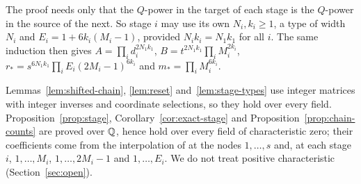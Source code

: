 \begin{remark}\label{rem:varying-powers}
The proof needs only that the \(Q\)-power in the target of each stage is
the \(Q\)-power in the source of the next. So stage \(i\) may use its own
\(N_i,k_i\ge1\), a type of width \(N_i\) and \(E_i=1+6k_i(M_i-1)\),
provided \(N_ik_i=N_1k_1\) for all \(i\).
The same induction then gives \(A=\prod_id_i^{2N_1k_1}\),
\(B=t^{2N_1k_1}\prod_iM_i^{2k_i}\),
\(r_*=s^{6N_1k_1}\prod_iE_i(2M_i-1)^{6k_i}\) and
\(m_*=\prod_iM_i^{6k_i}\).
\end{remark}

\begin{remark}[Fields]\label{rem:field-scope}
Lemmas~\ref{lem:shifted-chain}, \ref{lem:reset}
and~\ref{lem:stage-types} use integer matrices with integer inverses and
coordinate selections, so they hold over every field.
Proposition~\ref{prop:stage}, Corollary~\ref{cor:exact-stage} and
Proposition~\ref{prop:chain-counts} are proved over \(\mathbb Q\), hence hold over
every field of characteristic zero; their coefficients come from the
interpolation of \citep[Lemma~9.1]{FinCon26} at the nodes
\(1,\ldots,s\) and, at each stage \(i\), \(1,\ldots,M_i\),
\(1,\ldots,2M_i-1\) and \(1,\ldots,E_i\). We do not treat positive
characteristic (Section~\ref{sec:open}).
\end{remark}
